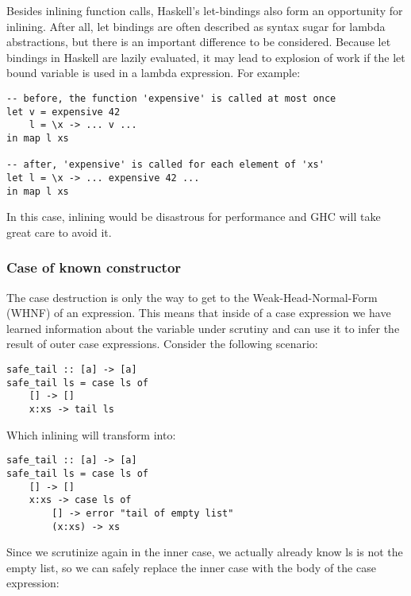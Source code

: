 Besides inlining function calls, Haskell's let-bindings also form an opportunity for inlining.
After all, let bindings are often described as syntax sugar for lambda abstractions, but there is an important difference to be considered.
Because let bindings in Haskell are lazily evaluated, it may lead to explosion of work if the let bound variable is used in a lambda
expression. For example:

\begin{listing}[H]
\begin{verbatim}
-- before, the function 'expensive' is called at most once
let v = expensive 42
    l = \x -> ... v ...
in map l xs

-- after, 'expensive' is called for each element of 'xs'
let l = \x -> ... expensive 42 ...
in map l xs
\end{verbatim}
\end{listing}

In this case, inlining would be disastrous for performance and GHC will take great care to avoid it. 

\subsubsection{Case of known constructor}

The case destruction is only the way to get to the Weak-Head-Normal-Form (WHNF) of an expression.
This means that inside of a case expression we have learned information about the variable under scrutiny and can use it to infer the result of outer case expressions.
Consider the following scenario:

\begin{listing}[H]
\begin{verbatim}
safe_tail :: [a] -> [a]
safe_tail ls = case ls of
    [] -> []
    x:xs -> tail ls
\end{verbatim}
\end{listing}

Which inlining will transform into:

\begin{listing}[H]
\begin{verbatim}
safe_tail :: [a] -> [a]
safe_tail ls = case ls of
    [] -> []
    x:xs -> case ls of
        [] -> error "tail of empty list"
        (x:xs) -> xs
\end{verbatim}
\end{listing}

Since we scrutinize  again in the inner case, we actually already know ls is not the empty list, so we can safely
replace the inner case with the body of the case expression:

